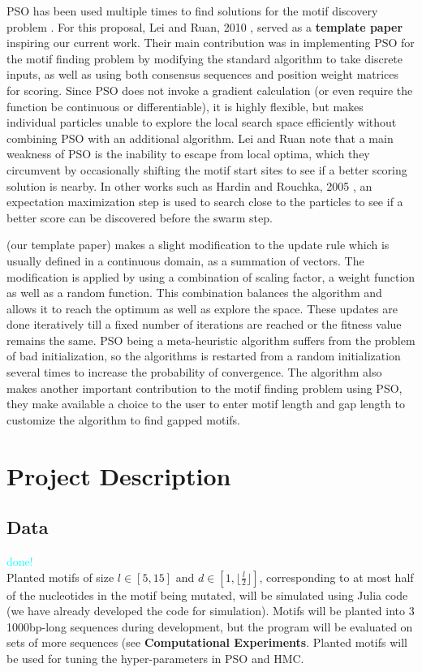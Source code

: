 \documentclass{article}
\begin{document}
PSO has been used multiple times to find solutions for the motif discovery problem \cite{hardin2005dna,lei2010particle,reddy2010planted,ge2019discovery}. For this proposal, Lei and Ruan, 2010 \cite{lei2010particle}, served as a \textbf{template paper} inspiring our current work. Their main contribution was in implementing PSO for the motif finding problem by modifying the standard algorithm to take discrete inputs, as well as using both consensus sequences and position weight matrices for scoring. Since PSO does not invoke a gradient calculation (or even require the function be continuous or differentiable), it is highly flexible, but makes individual particles unable to explore the local search space efficiently without combining PSO with an additional algorithm. Lei and Ruan note that a main weakness of PSO is the inability to escape from local optima, which they circumvent by occasionally shifting the motif start sites to see if a better scoring solution is nearby. In other works such as Hardin and Rouchka, 2005 \cite{hardin2005dna}, an expectation maximization step is used to search close to the particles to see if a better score can be discovered before the swarm step.

\cite{lei2010particle}(our template paper) makes a slight modification to the update rule which is usually defined in a continuous domain, as a summation of vectors. The modification is applied by using a combination of scaling factor, a weight function as well as a random function. This combination balances the algorithm and allows it to reach the optimum as well as explore the space. These updates are done iteratively till a fixed number of iterations are reached or the fitness value remains the same. PSO being a meta-heuristic algorithm suffers from the problem of bad initialization, so the algorithms is restarted from a random initialization several times to increase the probability of convergence.
The algorithm also makes another important contribution to the motif finding problem using PSO, they make available a choice to the user to enter motif length and gap length to customize the algorithm to find gapped motifs. 
\section{Project Description}
\subsection{Data}
\textcolor{cyan}{done!} \\
Planted motifs of size $l \in [5, 15]$ and $d \in [1, \lfloor \frac{l}{2} \rfloor]$, corresponding to at most half of the nucleotides in the motif being mutated, will be simulated using Julia code (we have already developed the code for simulation). Motifs will be planted into $3$ 1000bp-long sequences during development, but the program will be evaluated on sets of more sequences (see \textbf{Computational Experiments}. Planted motifs will be used for tuning the hyper-parameters in PSO and HMC.  
  
\end{document}
